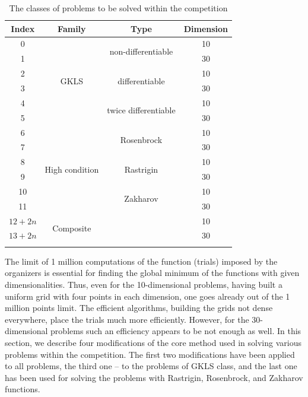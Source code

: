 \documentclass{llncs}
\begin{document}
\begin{table}
	\caption{The classes of problems to be solved within the competition}
	\label{tab:problems}
	\center
	\begin{tabular}{cccc}
		\hline\noalign{\smallskip}
		Index & Family & Type & Dimension \\
		\hline\noalign{\smallskip}
		0 &	 \multirow{6}{*}{GKLS} &	\multirow{2}{*}{non-differentiable} & 10 \\
		1 &	 &	 & 30 \\
		2 &	  &	\multirow{2}{*}{differentiable} & 10 \\
		3 &	 &	 & 30 \\
		4 &	  &	\multirow{2}{*}{twice differentiable} & 10 \\
		5 &	 &	 & 30 \\
		\hline\noalign{\smallskip}		
		6 &	\multirow{6}{*}{High condition}  &	\multirow{2}{*}{Rosenbrock} & 10 \\
		7 &	 &	 & 30 \\
		8 &	  &	\multirow{2}{*}{Rastrigin} & 10 \\
		9 &	 &	 & 30 \\
		10 &	  &	\multirow{2}{*}{Zakharov} & 10 \\
		11 &	 &	 & 30 \\
		\hline\noalign{\smallskip}
		$12+2n$ &	\multirow{2}{*}{Composite}  &	 & 10 \\
		$13+2n$ &	 &	 & 30 \\
\noalign{\smallskip}\hline
	\end{tabular}
\end{table}

The limit of 1 million computations of the function (trials) imposed by the organizers is essential for finding the global minimum of the functions with given dimensionalities. Thus, even for the 10-dimensional problems, having built a uniform grid with four points in each dimension, one goes already out of the 1 million points limit. The efficient algorithms, building the grids not dense everywhere, place the trials much more efficiently. However, for the 30-dimensional problems such an efficiency appears to be not enough as well. In this section, we describe four modifications of the core method used in solving various problems within the competition. The first two modifications have been applied to all problems, the third one – to the problems of GKLS class, and the last one has been used for solving the problems with Rastrigin, Rosenbrock, and Zakharov functions.
\end{document}
